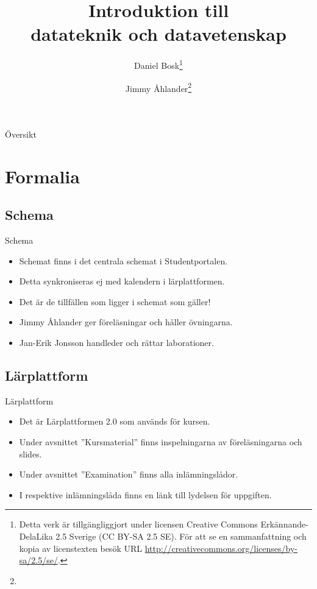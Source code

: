 \documentclass{beamer}
\title[Introduktion]{%
  Introduktion till \\
  datateknik och datavetenskap
}
\author{Daniel Bosk\footnote{%
	\tiny
	Detta verk är tillgängliggjort under licensen Creative Commons 
	Erkännande-DelaLika 2.5 Sverige (CC BY-SA 2.5 SE).
	För att se en sammanfattning och kopia av licenstexten besök URL 
	\url{http://creativecommons.org/licenses/by-sa/2.5/se/}.
}}
\author{Jimmy Åhlander\footnote{
}}
\institute[MIUN ITM]{%
  Avdelningen för informations- och kommunikationssytem (IKS),\\
  Mittuniversitetet, Sundsvall.
}
\date{\svnId}
\begin{document}
\begin{frame}
  \titlepage
\end{frame}

\begin{frame}{Översikt}
	\tableofcontents
\end{frame}





\section{Formalia}

\subsection{Schema}
\begin{frame}{Schema}
  \begin{itemize}
    \item Schemat finns i det centrala schemat i Studentportalen.
    \item Detta synkroniseras ej med kalendern i lärplattformen.
    \item Det är de tillfällen som ligger i schemat som gäller!
  \end{itemize}
  \begin{itemize}
    \item Jimmy Åhlander ger föreläsningar och håller övningarna. 
    \item Jan-Erik Jonsson handleder och rättar laborationer.
  \end{itemize}
\end{frame}

\subsection{Lärplattform}
\begin{frame}{Lärplattform}
  \begin{itemize}
    \item Det är Lärplattformen 2.0 som används för kursen.
    \item Under avsnittet ''Kursmaterial'' finns inspelningarna av 
      föreläsningarna och slides.
    \item Under avsnittet ''Examination'' finns alla inlämningslådor.
    \item I respektive inlämningslåda finns en länk till lydelsen för 
      uppgiften.
  \end{itemize}
\end{frame}
\end{document}
